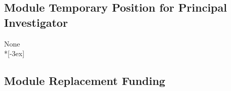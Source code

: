 \documentclass[11pt,a4paper,twoside]{scrartcl}
\begin{document}


%
%
%
%
%
%
%
%
%
%


\subsection{Module Temporary Position for Principal Investigator}
%

\qquad \quad None\\*[-3ex]

\subsection{Module Replacement Funding}
\end{document}
